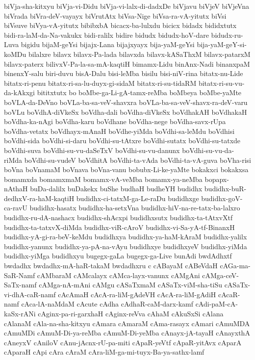 {biVja-sha-kitxyu
biVja-vi-Didu
biVja-vi-lalx-di-dadxDe
biVjavu
biVjeV
biVjeVna
biVrada
biVra-deV-vayayx
biVrutAtx
biVsa-Nige
biVsa-ra-vA-yitutx
biVsi
biVsuve
biVya-vA-yitutx
bibibxbA
bicacx-ba-lulxdu
bicicx
bidadx
bididxtutx
bidi-ra-laM-da-Na-vakukx
bidi-ralilx
bidire
bidudx
bidudx-hoV-dare
bidudx-ru-Luva
bigidu
bijaM-geYsi
bijajx-Lana
bijajxyayx
bija-yaM-geYsi
bija-yaM-geY-si-koMDu
bilalxre
bilavx
bilavx-Pa-lada
bilavxda
bilavx-kASaThxM
bilavx-patarxM
bilavx-paterx
bilivxV-Pa-la-sa-mA-kaqtiH
bimamx-Lidu
binAnx-Nadi
binanxpaM
binenxY-salu
biri-duvu
bisA-Dalu
bisi-leMba
bisilu
bisi-niV-rina
bitatx-nu-Lide
bitatx-ri-penu
bitatx-ri-sa-lu-duyx-gi-sidaM
bitatx-ri-su-tidaRM
bitatx-ri-su-vu-da-kAkxgi
bititxtutx
bo
boMbe-ga-Li-gA-tamx-reMba
boMbeya
boMbe-yaMte
boVLA-da-DeVno
boVLa-ba-sa-veV-shavxra
boVLa-ba-sa-veV-shavx-ra-deV-varu
boVLu
boVdhA-diVkeSx
boVdha-dali
boVdha-diVkeSx
boVdhakAH
boVdhakaH
boVdha-ka-nAgi
boVdha-karu
boVdhane
boVdha-nege
boVdha-savx-rUpa
boVdha-vetatx
boVdhayx-mAnaH
boVdhe-yiMda
boVdhi-sa-leMdu
boVdhisi
boVdhi-sida
boVdhi-si-daru
boVdhi-su-tAtxre
boVdhi-sutatx
boVdhi-su-tatxde
boVdhi-suva
boVdhi-su-vu-daSeTxV
boVdhi-su-vu-danunx
boVdhi-su-vu-da-riMda
boVdhi-su-vudeV
boVdhitA
boVdhi-ta-vAda
boVdhi-ta-vA-guva
boVha-risi
boVna
boVnamaM
boVnava
boVna-vanu
bobubx-Li-ke-yaMte
bokakxci
bokakxsa
bomamxda
bomamxmaM
bomamx-vA-veMba
bomamx-ya-neMba
bopapx-nAthaH
buDa-dalilx
buDakekx
buShe
budhaH
budheYH
budidhx
budidhx-buR-dedhxV-ra-haM-kaqtiH
budidhx-ci-tatxM-ga-Le-raDu
budidhxge
budidhx-goV-ca-ravU
budidhx-hasatx
budidhx-ha-setxVna
budidhx-hiV-na-re-tatx-ba-lalxro
budidhx-ru-dA-nashacx
budidhx-shAcxpi
budidhxsutx
budidhx-ta-tAtxvXtf
budidhx-ta-tatxvX-diMda
budidhx-viR-cAroV
budidhx-vi-Sa-yA-tf-BinanxH
budidhx-yA-gi-ra-beV-keMdu
budidhxya
budidhx-ya-haM-kAraM
budidhx-yalilx
budidhx-yanunx
budidhx-ya-pA-na-vAyu
budidhxye
budidhxyeV
budidhx-yiMda
budidhx-yiMga
budidhxyu
bugegx-gaLa
bugegx-ga-Live
bunAdi
bwdAdhxtf
bwdadhx
bwdadhx-mA-haR-takaM
bwdadhxru
c
cABayaM
cABeVdaH
cAGa-ma-SaR-Namf
cAMbaraM
cAMcalayx
cAMca-layx-vanunx
cAMgAni
cAMga-ceV-SaTx-namf
cAMga-nA-mAni
cAMgu
cASaTxmaM
cASaTx-viM-sha-tiSu
cASaTx-vi-dhA-caR-namf
cAcAmaH
cAcA-ra-liM-gAdeVH
cAcA-ra-liM-gAdiH
cAcaR-namf
cAca-lA-naMdaM
cAcute
cAdha
cAdhaR-caM-darx-kamf
cAdi-paM-cA-kaSx-rANi
cAginx-pa-ri-garxhaH
cAginx-reVva
cAhaM
cAkuSxSi
cAlana
cAlanaM
cAla-na-sha-kitxyu
cAmara
cAmaraM
cAma-rasayx
cAmari
cAmuMDA
cAmuMDi
cAmuM-Di-ya-reMba
cAmuM-Di-yeMba
cAnayx-jA-tayaH
cAnayxthA
cAneyxV
cAniloV
cAnu-jAcnx-rU-pa-miti
cApaR-yeVtf
cApaR-yitAvx
cAparA
cAparaH
cApi
cAra
cAraM
cAra-liM-ga-mi-tuyx-Ba-ya-sathx-lamf
}
